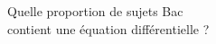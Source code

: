 \documentclass[preview]{standalone}
\begin{document}
\begin{center}
Quelle proportion de sujets Bac\\contient une équation différentielle ?
\end{center}
\end{document}
